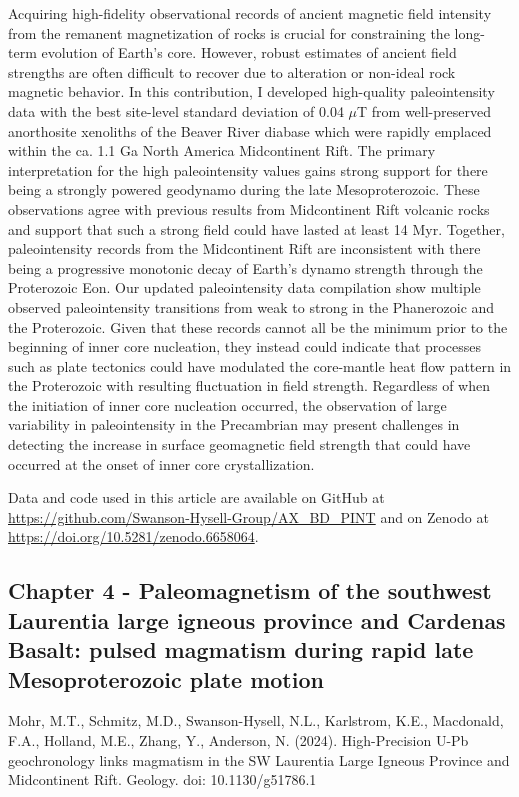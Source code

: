 \documentclass{ucbthesis}
\begin{document}
\begin{frontmatter}
Acquiring high-fidelity observational records of ancient magnetic field intensity from the remanent magnetization of rocks is crucial for constraining the long-term evolution of Earth’s core. However, robust estimates of ancient field strengths are often difficult to recover due to alteration or non-ideal rock magnetic behavior. In this contribution, I developed high-quality paleointensity data with the best site-level standard deviation of 0.04 $\mu$T from well-preserved anorthosite xenoliths of the Beaver River diabase which were rapidly emplaced within the ca. 1.1 Ga North America Midcontinent Rift. The primary interpretation for the high paleointensity values gains strong support for there being a strongly powered geodynamo during the late Mesoproterozoic. These observations agree with previous results from Midcontinent Rift volcanic rocks and support that such a strong field could have lasted at least 14 Myr. Together, paleointensity records from the Midcontinent Rift are inconsistent with there being a progressive monotonic decay of Earth’s dynamo strength through the Proterozoic Eon.
Our updated paleointensity data compilation show multiple observed paleointensity transitions from weak to strong in the Phanerozoic and the Proterozoic. Given that these records cannot all be the minimum prior to the beginning of inner core nucleation, they instead could indicate that processes such as plate tectonics could have modulated the core-mantle heat flow pattern in the Proterozoic with resulting fluctuation in field strength. Regardless of when the initiation of inner core nucleation occurred, the observation of large variability in paleointensity in the Precambrian may present challenges in detecting the increase in surface geomagnetic field strength that could have occurred at the onset of inner core crystallization.

Data and code used in this article are available on GitHub at \url{https://github.com/Swanson-Hysell-Group/AX_BD_PINT} and on Zenodo at \url{https://doi.org/10.5281/zenodo.6658064}.


\subsection{Chapter 4 - Paleomagnetism of the southwest Laurentia large igneous province and Cardenas Basalt: pulsed magmatism during rapid late Mesoproterozoic plate motion}

Mohr, M.T., Schmitz, M.D., Swanson-Hysell, N.L., Karlstrom, K.E., Macdonald, F.A., Holland, M.E., Zhang, Y., Anderson, N. (2024). High-Precision U-Pb geochronology links magmatism in the SW Laurentia Large Igneous Province and Midcontinent Rift. Geology. doi: 10.1130/g51786.1
\\


\end{frontmatter}
\end{document}
